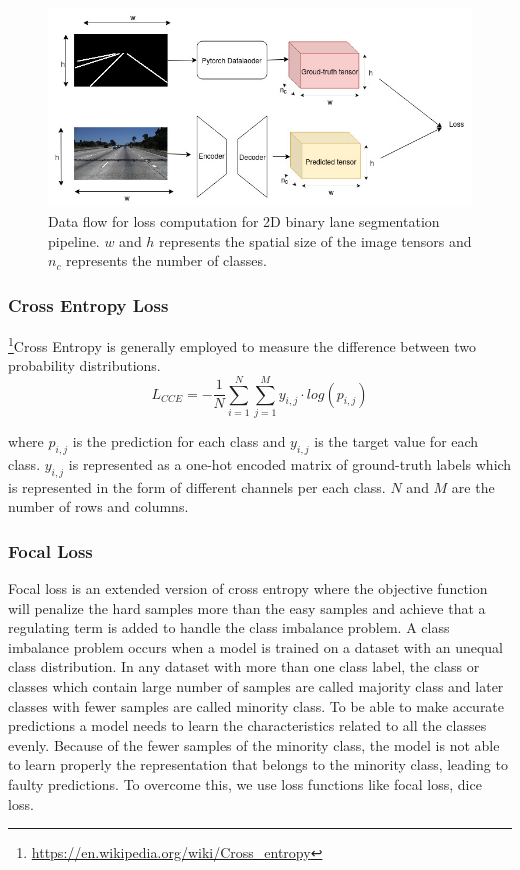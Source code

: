                  \begin{figure}[h]
    \centering
    \includegraphics[width=13cm]{images/2d_dataflow_loss_computation.jpg}
    \caption{Data flow for loss computation for 2D binary lane segmentation pipeline. $w$ and $h$ represents the spatial size of the image tensors and $n_{c}$ represents the number of classes. \cite{Tusimple}}
    \end{figure}
        
        \subsubsection{Cross Entropy Loss}
        \footnote{\url{https://en.wikipedia.org/wiki/Cross_entropy}}Cross Entropy is generally employed to measure the difference between two probability distributions.
        \begin{equation}
        L_{CCE} = -\frac{1}{N}\sum_{i=1}^{N} \sum^{M}_{j=1}y_{i,j}\cdot log(p_{i,j})
        \end{equation}
        
        where $p_{i,j}$ is the prediction for each class and $y_{i,j}$ is the target value for each class. $y_{i,j}$ is represented as a one-hot encoded matrix of ground-truth labels which is represented in the form of different channels per each class. $N$ and $M$ are the number of rows and columns.
       
        \subsubsection{Focal Loss}
        Focal loss is an extended version of cross entropy where the objective function will penalize the hard samples more than the easy samples and achieve that a regulating term is added to handle the class imbalance problem. A class imbalance problem occurs when a model is trained on a dataset with an unequal class distribution. In any dataset with more than one class label, the class or classes which contain large number of samples are called majority class and later classes with fewer samples are called minority class. To be able to make accurate predictions a model needs to learn the characteristics related to all the classes evenly. Because of the fewer samples of the minority class, the model is not able to learn properly the representation that belongs to the minority class, leading to faulty predictions. To overcome this, we use loss functions like focal loss, dice loss. 
        
